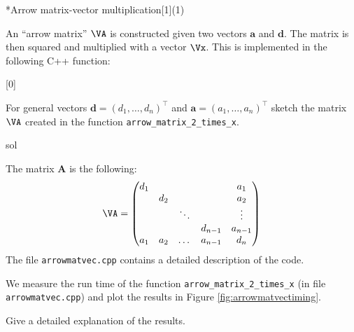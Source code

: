 
\begin{samproblem}*{}{Arrow matrix-vector multiplication}[1](1){
    An ``arrow matrix'' $\VA$ is constructed given two vectors $\mathbf{a}$ and $\mathbf{d}$.
    The matrix is then squared and multiplied with a vector $\Vx$. This is implemented in the
    following C++ function:

[0]

}

\begin{subproblem}{}

  For general vectors $\mathbf{d} = (d_1, \dots, d_n)^\top$ and $\mathbf{a} = (a_1, \dots, a_n)^\top$
  sketch the matrix $\VA$ created in the function \verb|arrow_matrix_2_times_x|.

  \begin{samwriteprbpart}{sol}
  \begin{samsolution}
    The matrix $\mathbf{A}$ is the following:
    \begin{align}
    \VA=\begin{pmatrix}
      d_1 &     &        &         & a_1     \\
          & d_2 &        &         & a_2     \\
          &     & \ddots &         & \vdots  \\
          &     &        & d_{n-1} & a_{n-1} \\
      a_1 & a_2 & \dots  & a_{n-1} & d_n     \\
    \end{pmatrix}
    \end{align}
    The file \texttt{arrowmatvec.cpp} contains a detailed description of the code.
  \end{samsolution}
\end{samwriteprbpart}
\end{subproblem}

\begin{subproblem}{}
  We measure the run time of the function \verb|arrow_matrix_2_times_x| (in file \texttt{arrowmatvec.cpp})
  and plot the results in Figure \ref{fig:arrowmatvectiming}.

  Give a detailed explanation of the results.



\end{subproblem}
\end{samproblem}
